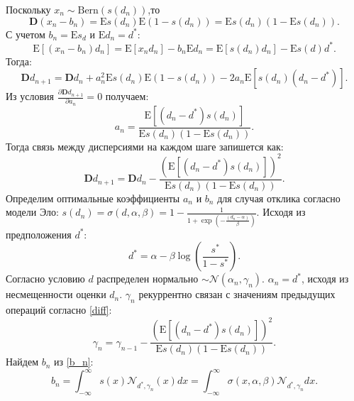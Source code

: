 Поскольку $x_n \sim \text{Bern}(s(d_n))$,то
\begin{equation}
    \mathbf{D}(x_n-b_n) = \mathrm{E} s(d_n) \mathrm{E} (1-s(d_n))=  \mathrm{E} s(d_n)  (1-\mathrm{E}s(d_n)).
\end{equation}
С учетом $b_n = \mathrm{E} s_d$ и $\mathrm{E} d_n =d^*$:
\begin{equation}
    \mathrm{E}\left[(x_n-b_n)d_n\right] = \mathrm{E}\left[x_n d_n \right] - b_n  \mathrm{E} d_n = \mathrm{E} \left[s(d_n) d_n\right] - \mathrm{E} s(d) d^*.
\end{equation}
Тогда:
\begin{equation}
    \mathbf{D} d_{n+1} = \mathbf{D} d_n + a_n^2 \mathrm{E}s(d_n)\mathrm{E}(1-s(d_n)) - 2 a_n \mathrm{E}\left[ s(d_n) (d_n-d^*)\right].
\end{equation}
Из условия $\frac{\partial \mathbf{D}{d_{n+1}}}{\partial a_n} =0 $ получаем:
\begin{equation}
    \label{diff}
    a_n = \frac{\mathrm{E} \left[ (d_n-d^*) s(d_n)\right]}{\mathrm{E}s(d_n)(1 - \mathrm{E}s(d_n))}.
\end{equation}
Тогда связь между дисперсиями на каждом шаге запишется как:
\begin{equation}
    \mathbf{D} d_{n+1} = \mathbf{D} d_n - \frac{\left(\mathrm{E} \left[ (d_n-d^*) s(d_n)\right] \right)^2}{\mathrm{E}s(d_n)(1 - \mathrm{E}s(d_n))}.
\end{equation}
Определим оптимальные коэффициенты $a_n$ и $b_n$ для случая отклика согласно модели Эло: $s(d_n) = \sigma(d,\alpha,\beta) = 1 - \frac{1}{1+\exp(-\frac{(d_n-\alpha)}{\beta})}$. 
Исходя из предположения $d^*$:
\begin{equation}
    d^* = \alpha  - \beta \log\left(\frac{s^*}{1-s^*}\right).
\end{equation}
Согласно условию $d$ распределен нормально $\sim \mathcal{N}(\alpha_n,\gamma_n)$. $\alpha_n = d^*$, исходя из несмещенности оценки $d_n$. $\gamma_n$ 
рекуррентно связан с значениям предыдущих операций согласно \ref{diff}:
\begin{equation}
    \label{gamma_connection}
    \gamma_n = \gamma_{n-1} - \frac{\left(\mathrm{E} \left[ (d_n-d^*) s(d_n)\right] \right)^2}{\mathrm{E}s(d_n)(1 - \mathrm{E}s(d_n))}.
\end{equation}
Найдем $b_n$ из \ref{b_n}:
\begin{equation}
    b_n = \int_{-\infty}^{\infty} s(x) \mathcal{N}_{d^*,\gamma_n}(x) d x = \int_{-\infty}^{\infty} \sigma(x,\alpha,\beta) \mathcal{N}_{d^*,\gamma_n} d x.
\end{equation}
